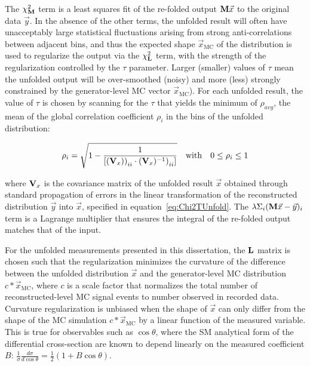 The $\chi^{2}_{\mathbf{M}}$ term is a least squares fit of the re-folded output $\mathbf{M}\vec{x}$ to the original data $\vec{y}$.
In the absence of the other terms, the unfolded result will often have unacceptably large statistical fluctuations arising from strong anti-correlations between adjacent bins, and thus the expected shape $\vec{x}_{\text{MC}}$ of the distribution is used to regularize the output via the $\chi^{2}_{\mathbf{L}}$ term, with the strength of the regularization controlled by the $\tau$ parameter. 
Larger (smaller) values of $\tau$ mean the unfolded output will be over-smoothed (noisy) and more (less) strongly constrained by the generator-level MC vector $\vec{x}_{\text{MC}}$).
For each unfolded result, the value of $\tau$ is chosen by scanning for the $\tau$ that yields the minimum of $\rho_{avg}$, the mean of the global correlation coefficient $\rho_{i}$ in the bins of the unfolded distribution:
\begin{linenomath*}
\begin{align}
\rho_{i} = \sqrt{1 - \frac{1}{[{(\mathbf{V}_{x}))}_{ii} \cdot {(\mathbf{V}_{x})^{-1})}_{ii}]}} \quad \text{with} \quad 0 \leq \rho_{i} \leq 1
\end{align}
\end{linenomath*}
where $\mathbf{V}_{x}$ is the covariance matrix of the unfolded result $\vec{x}$ obtained through standard propagation of errors in the linear transformation of the reconstructed distribution $\vec{y}$ into $\vec{x}$, specified in equation~\ref{eq:Chi2TUnfold}.
The $\lambda\Sigma_{i}(\mathbf{M}\vec{x}-\vec{y})_{i}$ term is a Lagrange multiplier that ensures the integral of the re-folded output matches that of the input.

For the unfolded measurements presented in this dissertation, the $\mathbf{L}$ matrix is chosen such that the regularization minimizes the curvature of the difference between the unfolded distribution $\vec{x}$ and the generator-level MC distribution $c*\vec{x}_{\text{MC}}$, where $c$ is a scale factor that normalizes the total number of reconstructed-level MC signal events to number observed in recorded data.
Curvature regularization is unbiased when the shape of $\vec{x}$ can only differ from the shape of the MC simulation $c*\vec{x}_{\text{MC}}$ by a linear function of the measured variable. 
This is true for observables such as $\cos\theta$, where the SM analytical form of the differential cross-section are known to depend linearly on the measured coefficient $B$: $\tfrac{1}{\sigma}\tfrac{d\sigma}{d\cos\theta} = \tfrac{1}{2} (1+B \cos\theta)$. 

